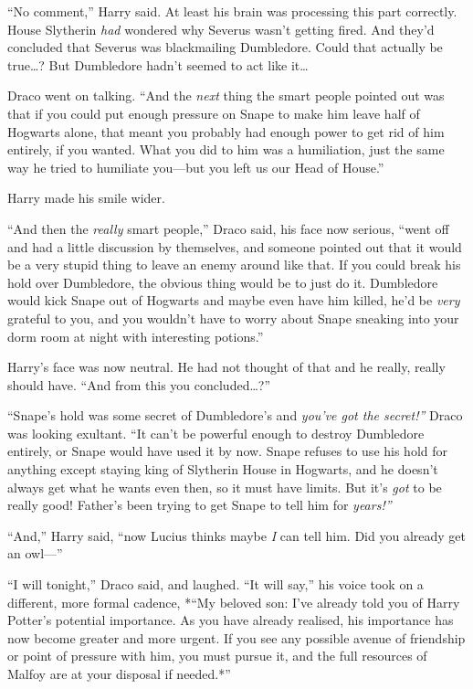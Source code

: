 ``No comment,'' Harry said. At least his brain was processing this part
correctly. House Slytherin \emph{had} wondered why Severus wasn't
getting fired. And they'd concluded that Severus was blackmailing
Dumbledore. Could that actually be true\ldots{}? But Dumbledore hadn't
seemed to act like it\ldots{}

Draco went on talking. ``And the \emph{next} thing the smart people
pointed out was that if you could put enough pressure on Snape to make
him leave half of Hogwarts alone, that meant you probably had enough
power to get rid of him entirely, if you wanted. What you did to him was
a humiliation, just the same way he tried to humiliate you---but you
left us our Head of House.''

Harry made his smile wider.

``And then the \emph{really} smart people,'' Draco said, his face now
serious, ``went off and had a little discussion by themselves, and
someone pointed out that it would be a very stupid thing to leave an
enemy around like that. If you could break his hold over Dumbledore, the
obvious thing would be to just do it. Dumbledore would kick Snape out of
Hogwarts and maybe even have him killed, he'd be \emph{very} grateful to
you, and you wouldn't have to worry about Snape sneaking into your dorm
room at night with interesting potions.''

Harry's face was now neutral. He had not thought of that and he really,
really should have. ``And from this you concluded\ldots{}?''

``Snape's hold was some secret of Dumbledore's and \emph{you've got the
secret!''} Draco was looking exultant. ``It can't be powerful enough to
destroy Dumbledore entirely, or Snape would have used it by now. Snape
refuses to use his hold for anything except staying king of Slytherin
House in Hogwarts, and he doesn't always get what he wants even then, so
it must have limits. But it's \emph{got} to be really good! Father's
been trying to get Snape to tell him for \emph{years!''}

``And,'' Harry said, ``now Lucius thinks maybe \emph{I} can tell him.
Did you already get an owl---''

``I will tonight,'' Draco said, and laughed. ``It will say,'' his voice
took on a different, more formal cadence, *``My beloved son: I've
already told you of Harry Potter's potential importance. As you have
already realised, his importance has now become greater and more urgent.
If you see any possible avenue of friendship or point of pressure with
him, you must pursue it, and the full resources of Malfoy are at your
disposal if needed.*''

